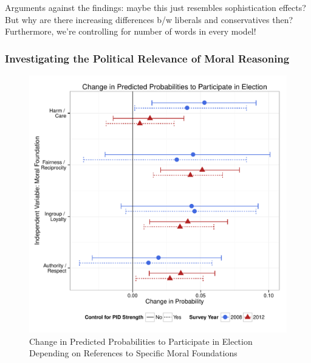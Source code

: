 \documentclass[12pt]{paper}
\begin{document}
Arguments against the findings: maybe this just resembles sophistication effects? But why are there increasing differences b/w liberals and conservatives then? Furthermore, we're controlling for number of words in every model!

\subsubsection{Investigating the Political Relevance of Moral Reasoning}

\begin{figure}[ht]\centering
\includegraphics[scale=.6]{../calc/fig/m2b_vote.pdf}
\caption{Change in Predicted Probabilities to Participate in Election Depending on References to Specific Moral Foundations}\label{fig:m2b_vote}
\end{figure}
\end{document}
